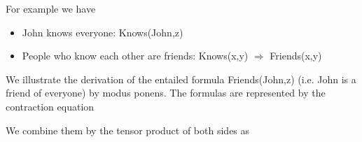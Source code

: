 \begin{example}\label{exa:liftedModusPonens}
    For example we have
    \begin{itemize}
        \item John knows everyone: Knows(John,z)
        \item People who know each other are friends: Knows(x,y) $\Rightarrow$ Friends(x,y)
    \end{itemize}
    We illustrate the derivation of the entailed formula Friends(John,z) (i.e. John is a friend of everyone) by modus ponens.
    The formulas are represented by the contraction equation


    We combine them by the tensor product of both sides as


\end{example}
